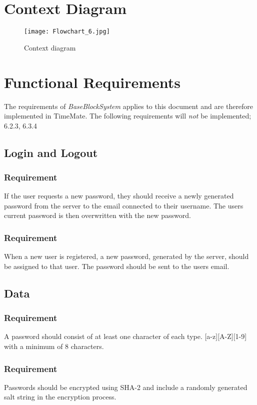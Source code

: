 \documentclass{article}
\begin{document}
\section{Context Diagram}
\begin{figure}[ht]
\centering
\texttt{[image: Flowchart\_6.jpg]}
\caption{Context diagram}
\end{figure}

\section{Functional Requirements}
\item The requirements of \emph{BaseBlockSystem} applies to this document and are therefore implemented in TimeMate. The following requirements will \emph{not} be implemented; 6.2.3, 6.3.4

\subsection{Login and Logout}


\subsubsection{Requirement}
If the user requests a new password, they should receive a newly generated password from the server to the email connected to their username. The users current password is then overwritten with the new password.

\subsubsection{Requirement}
When a new user is registered, a new password, generated by the server, should be assigned to that user. The password should be sent to the users email.

\subsection{Data}
\subsubsection{Requirement}
A password should consist of at least one character of each type. [a-z][A-Z][1-9] with a minimum of 8 characters.
\subsubsection{Requirement}
Passwords should be encrypted using SHA-2 and include a randomly generated salt string in the encryption process.
\end{document}
